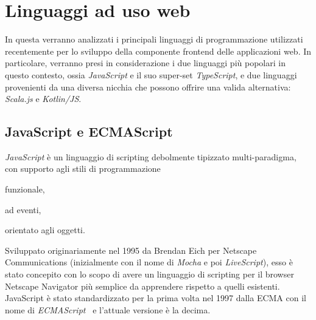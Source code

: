 
  \section{Linguaggi ad uso web}\label{sec:lang}
    In questa  verranno analizzati i principali linguaggi di programmazione utilizzati recentemente per lo sviluppo della componente frontend delle applicazioni web.
    In particolare, verranno presi in considerazione i due linguaggi più popolari in questo contesto, ossia \emph{JavaScript} e il suo super-set \emph{TypeScript}, e due linguaggi provenienti da una diversa nicchia che possono offrire una valida alternativa: \emph{Scala.js} e \emph{Kotlin/JS}\@.

    \subsection{JavaScript e ECMAScript}\label{subsec:js}


      \emph{JavaScript} è un linguaggio di scripting debolmente tipizzato multi-paradigma, con supporto agli stili di programmazione %
      \begin{inparaitem}
        \item funzionale,
        \item ad eventi,
        \item orientato agli oggetti.
      \end{inparaitem}
      Sviluppato originariamente nel 1995 da Brendan Eich per Netscape Communications (inizialmente con il nome di \emph{Mocha} e poi \emph{LiveScript}),
      esso è stato concepito con lo scopo di avere un linguaggio di scripting per il browser Netscape Navigator più semplice da apprendere rispetto a quelli esistenti.
      JavaScript è stato standardizzato per la prima volta nel 1997 dalla ECMA con il nome di \emph{ECMAScript}~\cite{ECMA-262,ISO:1998} e l'attuale versione è la decima.

